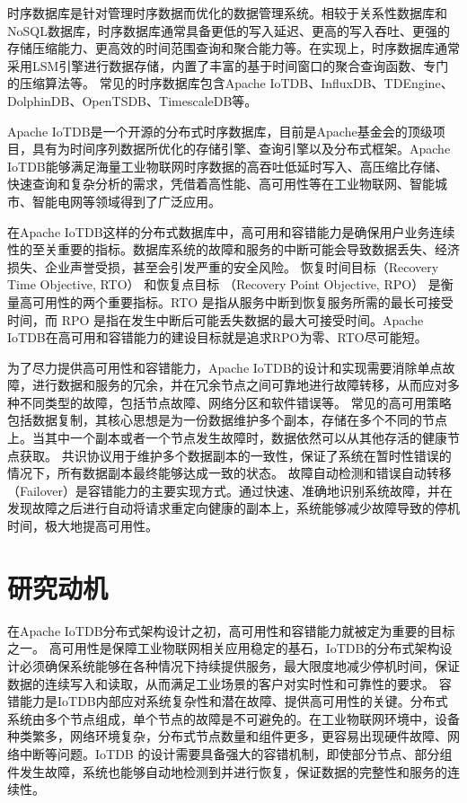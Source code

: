 时序数据库\cite{naqvi2017timeseriesdb}是针对管理时序数据而优化的数据管理系统。相较于关系性数据库\cite{codd2007relational}和NoSQL数据库\cite{han2011surveynosql}，时序数据库通常具备更低的写入延迟、更高的写入吞吐、更强的存储压缩能力、更高效的时间范围查询和聚合能力等。在实现上，时序数据库通常采用LSM\cite{o1996lsmtree}引擎进行数据存储，内置了丰富的基于时间窗口的聚合查询函数、专门的压缩算法等。
常见的时序数据库包含Apache IoTDB\cite{wang2020iotdb}、InfluxDB\cite{shahid2019influxdb}、TDEngine\cite{tdengine_website}、DolphinDB\cite{dolphindb_website}、OpenTSDB\cite{opentsdb_website}、TimescaleDB\cite{timescale_website}等。

Apache IoTDB是一个开源的分布式时序数据库，目前是Apache基金会的顶级项目，具有为时间序列数据所优化的存储引擎、查询引擎以及分布式框架。Apache IoTDB能够满足海量工业物联网时序数据的高吞吐低延时写入、高压缩比存储、快速查询和复杂分析的需求，凭借着高性能、高可用性等在工业物联网、智能城市、智能电网等领域得到了广泛应用。

在Apache IoTDB这样的分布式数据库中，高可用和容错能力\cite{gray2002high}是确保用户业务连续性的至关重要的指标。数据库系统的故障和服务的中断可能会导致数据丢失、经济损失、企业声誉受损，甚至会引发严重的安全风险。
恢复时间目标（Recovery Time Objective, RTO） 和恢复点目标 （Recovery Point Objective, RPO） \cite{suguna2014overview}是衡量高可用性的两个重要指标。RTO 是指从服务中断到恢复服务所需的最长可接受时间，而 RPO 是指在发生中断后可能丢失数据的最大可接受时间。Apache IoTDB在高可用和容错能力的建设目标就是追求RPO为零、RTO尽可能短。

为了尽力提供高可用性和容错能力，Apache IoTDB的设计和实现需要消除单点故障，进行数据和服务的冗余，并在冗余节点之间可靠地进行故障转移，从而应对多种不同类型的故障，包括节点故障、网络分区和软件错误等。
常见的高可用策略包括数据复制\cite{milani2017systematic}，其核心思想是为一份数据维护多个副本，存储在多个不同的节点上。当其中一个副本或者一个节点发生故障时，数据依然可以从其他存活的健康节点获取。
共识协议用于维护多个数据副本的一致性，保证了系统在暂时性错误的情况下，所有数据副本最终能够达成一致的状态。
故障自动检测和错误自动转移（Failover）\cite{mohammed2017failover}是容错能力的主要实现方式。通过快速、准确地识别系统故障，并在发现故障之后进行自动将请求重定向健康的副本上，系统能够减少故障导致的停机时间，极大地提高可用性。


\section{研究动机}\label{1-motivation}

在Apache IoTDB分布式架构设计之初，高可用性和容错能力就被定为重要的目标之一。
高可用性是保障工业物联网相关应用稳定的基石，IoTDB的分布式架构设计必须确保系统能够在各种情况下持续提供服务，最大限度地减少停机时间，保证数据的连续写入和读取，从而满足工业场景的客户对实时性和可靠性的要求。
容错能力是IoTDB内部应对系统复杂性和潜在故障、提供高可用性的关键。分布式系统由多个节点组成，单个节点的故障是不可避免的。在工业物联网环境中，设备种类繁多，网络环境复杂，分布式节点数量和组件更多，更容易出现硬件故障、网络中断等问题。IoTDB 的设计需要具备强大的容错机制，即使部分节点、部分组件发生故障，系统也能够自动地检测到并进行恢复，保证数据的完整性和服务的连续性。



